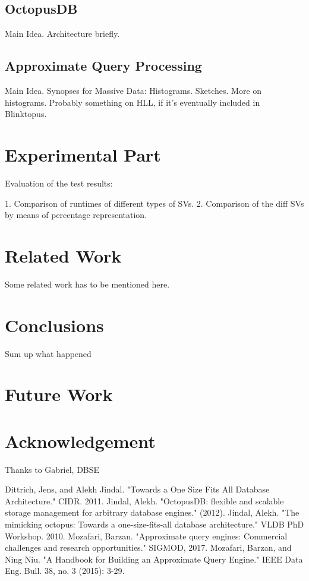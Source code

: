 \documentclass[10pt, conference, compsocconf]{IEEEtran}
\begin{document}
\subsection{OctopusDB}
Main Idea. Architecture briefly.

\subsection{Approximate Query Processing}
Main Idea. Synopses for Massive Data: Histograms. Sketches.
More on histograms. 
Probably something on HLL, if it's eventually included in Blinktopus.

\section{Experimental Part}
Evaluation of the test results:
 
1. Comparison of runtimes of different types of SVs.
2. Comparison of the diff SVs by means of percentage representation.

\section{Related Work}
Some related work has to be mentioned here.

\section{Conclusions}
Sum up what happened

\section{Future Work}


\section*{Acknowledgement}
Thanks to Gabriel, DBSE

\begin{thebibliography}{1}

Dittrich, Jens, and Alekh Jindal. "Towards a One Size Fits All Database Architecture." CIDR. 2011.
Jindal, Alekh. "OctopusDB: flexible and scalable storage management for arbitrary database engines." (2012).
Jindal, Alekh. "The mimicking octopus: Towards a one-size-fits-all database architecture." VLDB PhD Workshop. 2010.
Mozafari, Barzan. "Approximate query engines: Commercial challenges and research opportunities." SIGMOD, 2017.
Mozafari, Barzan, and Ning Niu. "A Handbook for Building an Approximate Query Engine." IEEE Data Eng.
Bull. 38, no. 3 (2015): 3-29.
\end{thebibliography}
\end{document}
